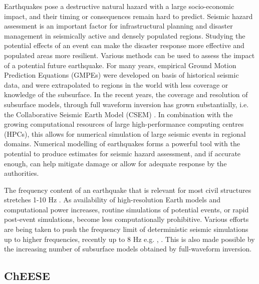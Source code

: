\documentclass[../Text/00main.tex]{subfiles}
\begin{document}
Earthquakes pose a destructive natural hazard with a large socio-economic impact, and their timing or consequences remain hard to predict. Seismic hazard assessment is an important factor for infrastructural planning and disaster management in seismically active and densely populated regions. Studying the potential effects of an event can make the disaster response more effective and populated areas more resilient. Various methods can be used to assess the impact of a potential future earthquake. For many years, empirical Ground Motion Prediction Equations (GMPEs) were developed on basis of historical seismic data, and were extrapolated to regions in the world with less coverage or knowledge of the subsurface. In the recent years, the coverage and resolution of subsurface models, through full waveform inversion has grown substantially, i.e. the Collaborative Seismic Earth Model (CSEM) \citep{afanasiev2016foundations}. In combination with the growing computational resources of large high-performance computing centres (HPCs), this allows for numerical simulation of large seismic events in regional domains. Numerical modelling of earthquakes forms a powerful tool with the potential to produce estimates for seismic hazard assessment, and if accurate enough, can help mitigate damage or allow for adequate response by the authorities.  

The frequency content of an earthquake that is relevant for most civil structures stretches 1-10 Hz \cite{chandler1997dynamics}. As availability of high-resolution Earth models and computational power increases, routine simulations of potential events, or rapid post-event simulations, become less computationally prohibitive. Various efforts are being taken to push the frequency limit of deterministic seismic simulations up to higher frequencies, recently up to 8 Hz e.g. \cite{rodgers_broadband_2019}, \cite{he2015simulation}. This is also made possible by the increasing number of subsurface models obtained by full-waveform inversion. 

\subsection{ChEESE}
\end{document}
